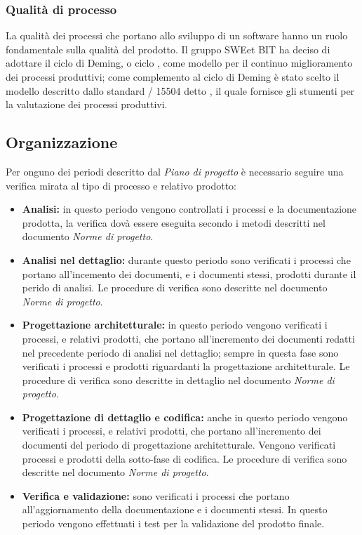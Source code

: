     \subsubsection{Qualità di processo}
    La qualità dei processi che portano allo sviluppo di un software hanno un ruolo fondamentale sulla qualità del prodotto.
    Il gruppo SWEet BIT ha deciso di adottare il ciclo di Deming, o ciclo , come modello per il continuo miglioramento dei processi produttivi;
    come complemento al ciclo di Deming è stato scelto il modello descritto dallo standard / 15504 detto ,
    il quale fornisce gli stumenti per la valutazione dei processi produttivi.

  \subsection{Organizzazione}
    Per onguno dei periodi descritto dal \emph{Piano di progetto} è necessario seguire una verifica mirata al tipo di processo e relativo prodotto:
    \begin{itemize}
      \item \textbf{Analisi:} in questo periodo vengono controllati i processi e la documentazione prodotta,
      la verifica dovà essere eseguita secondo i metodi descritti nel documento \emph{Norme di progetto}.
      \item \textbf{Analisi nel dettaglio:} durante questo periodo sono verificati i processi che portano all'incemento dei documenti, e i documenti stessi, prodotti durante il perido di analisi.
      Le procedure di verifica sono descritte nel documento \emph{Norme di progetto}.
      \item \textbf{Progettazione architetturale:} in questo periodo vengono verificati i processi, e relativi prodotti, che portano all'incremento dei documenti redatti nel precedente periodo di analisi nel dettaglio;
      sempre in questa fase sono verificati i processi e prodotti riguardanti la progettazione architetturale.
      Le procedure di verifica sono descritte in dettaglio nel documento \emph{Norme di progetto}.
      \item \textbf{Progettazione di dettaglio e codifica:} anche in questo periodo vengono verificati i processi, e relativi prodotti, che portano all'incremento dei documenti del periodo di progettazione architetturale.
      Vengono verificati processi e prodotti della sotto-fase di codifica. Le procedure di verifica sono descritte nel documento \emph{Norme di progetto}.
      \item \textbf{Verifica e validazione:} sono verificati i processi che portano all'aggiornamento della documentazione e i documenti stessi.
      In questo periodo vengono effettuati i test per la validazione del prodotto finale.
    \end{itemize}

